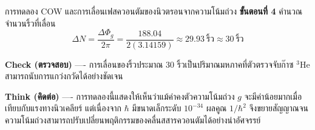 \begin{psctbox}{การทดลอง COW และการเลื่อนเฟสควอนตัมของนิวตรอนจากความโน้มถ่วง}
\textbf{ขั้นตอนที่ 4} คำนวณจำนวนริ้วที่เลื่อน
\begin{equation*}
\Delta N = \frac{\Delta\Phi_g}{2\pi} = \frac{188.04}{2(3.14159)} \approx 29.93~\text{ริ้ว} \approx 30~\text{ริ้ว}
\end{equation*}

\textbf{Check (ตรวจสอบ)} ---- การเลื่อนของริ้วประมาณ 30 ริ้วเป็นปริมาณมหภาคที่ตัวตรวจจับก๊าซ $^3\text{He}$ สามารถนับการแกว่งกวัดได้อย่างชัดเจน

\textbf{Think (คิดต่อ)} ---- การทดลองนี้แสดงให้เห็นว่าแม้ค่าคงตัวความโน้มถ่วง $g$ จะมีค่าน้อยมากเมื่อเทียบกับแรงทางนิวเคลียร์ แต่เนื่องจาก $\hbar$ มีขนาดเล็กระดับ $10^{-34}$ ผลคูณ $1/\hbar^2$ จึงขยายสัญญาณจนความโน้มถ่วงสามารถปรับเปลี่ยนพฤติกรรมของคลื่นสสารควอนตัมได้อย่างน่าอัศจรรย์
\end{psctbox}

